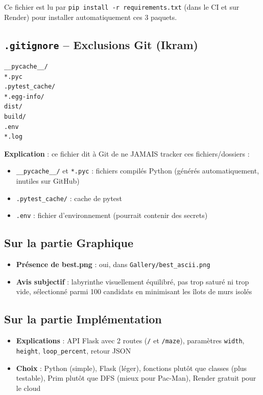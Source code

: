 \documentclass[12pt,a4paper]{article}
\begin{document}
Ce fichier est lu par \texttt{pip install -r requirements.txt} (dans le CI et sur Render) pour installer automatiquement ces 3 paquets.

\subsection{\texttt{.gitignore} -- Exclusions Git (Ikram)}

\begin{lstlisting}[caption={Fichiers ignorés par Git}]
__pycache__/
*.pyc
.pytest_cache/
*.egg-info/
dist/
build/
.env
*.log
\end{lstlisting}

\textbf{Explication} : ce fichier dit à Git de ne JAMAIS tracker ces fichiers/dossiers :
\begin{itemize}
    \item \texttt{\_\_pycache\_\_/} et \texttt{*.pyc} : fichiers compilés Python (générés automatiquement, inutiles sur GitHub)
    \item \texttt{.pytest\_cache/} : cache de pytest
    \item \texttt{.env} : fichier d'environnement (pourrait contenir des secrets)
\end{itemize}

\subsection{Sur la partie Graphique}
\begin{itemize}
    \item \textbf{Présence de best.png} : oui, dans \texttt{Gallery/best\_ascii.png}
    \item \textbf{Avis subjectif} : labyrinthe visuellement équilibré, pas trop saturé ni trop vide, sélectionné parmi 100 candidats en minimisant les îlots de murs isolés
\end{itemize}

\subsection{Sur la partie Implémentation}
\begin{itemize}
    \item \textbf{Explications} : API Flask avec 2 routes (\texttt{/} et \texttt{/maze}), paramètres \texttt{width}, \texttt{height}, \texttt{loop\_percent}, retour JSON
    \item \textbf{Choix} : Python (simple), Flask (léger), fonctions plutôt que classes (plus testable), Prim plutôt que DFS (mieux pour Pac-Man), Render gratuit pour le cloud
\end{itemize}
\end{document}
